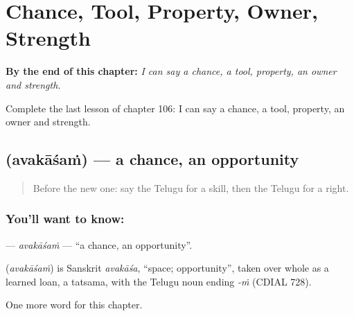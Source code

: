 
\chapter{Chance, Tool, Property, Owner, Strength}
\label{ch:te-chance-tool-property-owner-strength}

\begin{chapteropening}
\textbf{By the end of this chapter:} \emph{I can say a chance, a tool, property, an owner and strength.}

Complete the last lesson of chapter 106: I can say a chance, a tool, property, an owner and strength.
\end{chapteropening}

\section[\texorpdfstring{\te{అవకాశం} (avakāśaṁ)}{అవకాశం (avakāśaṁ)}]{ (avakāśaṁ) — a chance, an opportunity}

\label{lesson:TE-C106-avakasam}



\begin{quote}
Before the new one: say the Telugu for a skill, then the Telugu for a right.
\end{quote}

\subsection*{You'll want to know: }
\textbf{} — \emph{avakāśaṁ} — \textquotedblleft{}a chance, an opportunity\textquotedblright{}.

\begin{cousinweb}
\textbf{} (\emph{avakāśaṁ}) is Sanskrit \emph{avakāśa}, \textquotedblleft{}space; opportunity\textquotedblright{}, taken over whole as a learned loan, a tatsama, with the Telugu noun ending \emph{-ṁ} (CDIAL 728).
\end{cousinweb}

\begin{grammarlens}[title={What you've built}]
One more word for this chapter.
\end{grammarlens}

